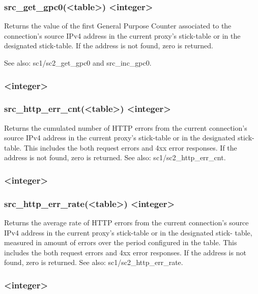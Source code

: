\subsubsection*{src\_get\_gpc0(<table>) <integer>}

  Returns the value of the first General Purpose Counter associated to the
  connection's source IPv4 address in the current proxy's stick-table or in
  the designated stick-table. If the address is not found, zero is returned.

See also: sc1/sc2\_get\_gpc0 and src\_inc\_gpc0.

\subsubsection[src\_http\_err\_cnt]{ <integer>}
\subsubsection*{src\_http\_err\_cnt(<table>) <integer>}

  Returns the cumulated number of HTTP errors from the current connection's
  source IPv4 address in the current proxy's stick-table or in the designated
  stick-table. This includes the both request errors and 4xx error responses.
  If the address is not found, zero is returned.
See also: sc1/sc2\_http\_err\_cnt.

\subsubsection[src\_http\_err\_rate]{ <integer>}
\subsubsection*{src\_http\_err\_rate(<table>) <integer>}

  Returns the average rate of HTTP errors from the current connection's source
  IPv4 address in the current proxy's stick-table or in the designated stick-
  table, measured in amount of errors over the period configured in the table.
  This includes the both request errors and 4xx error responses. If the address
  is not found, zero is returned.
See also: sc1/sc2\_http\_err\_rate.

\subsubsection[src\_http\_req\_cnt]{ <integer>}
